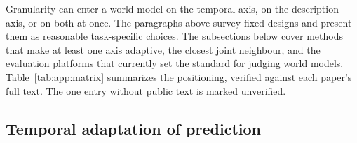 Granularity can enter a world model on the temporal axis, on the description axis, or on both at once. The paragraphs above survey fixed designs and present them as reasonable task-specific choices. The subsections below cover methods that make at least one axis adaptive, the closest joint neighbour, and the evaluation platforms that currently set the standard for judging world models. Table~\ref{tab:app:matrix} summarizes the positioning, verified against each paper's full text. The one entry without public text is marked unverified.

\subsection{Temporal adaptation of prediction}
\label{sec:app:rel:temporal}

